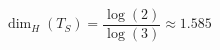 \documentclass[preview]{standalone}
\begin{document}
\begin{center}
$\operatorname{dim}_H(T_S)=\dfrac{\log(2)}{\log(3)}\approx 1.585$
\end{center}
\end{document}
